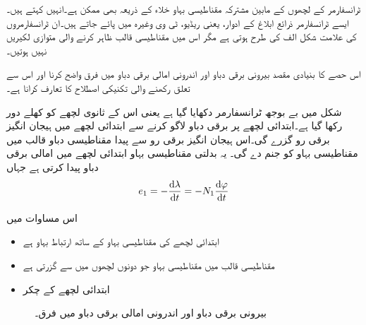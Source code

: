 ٹرانسفارمر کے لچھوں کے مابین مشترکہ مقناطیسی بہاو خلاء کے ذریعہ بھی ممکن ہے۔انہیں   کہتے ہیں۔ ایسے ٹرانسفارمر ذرائع ابلاغ کے ادوار، یعنی ریڈیو، ٹی وی وغیرہ میں پائے جاتے ہیں۔ان ٹرانسفارمروں کی علامت  شکل  الف کی طرح ہوتی ہے مگر اس میں مقناطیسی قالب ظاہر کرنے والی متوازی لکیریں نہیں ہوتیں۔

اس حصے کا بنیادی مقصد بیرونی برقی دباو   اور اندرونی امالی برقی دباو   میں فرق واضح کرنا اور اس سے تعلق رکھنے والی تکنیکی اصطلاح کا تعارف کرانا ہے۔

شکل   میں بے بوجھ ٹرانسفارمر دکھایا گیا ہے یعنی اس کے ثانوی لچھے کو کھلے دور رکھا گیا ہے۔ابتدائی لچھے پر  برقی دباو لاگو کرنے سے ابتدائی لچھے میں ہیجان انگیز برقی رو  گزرے گی۔اس ہیجان انگیز برقی رو سے پیدا مقناطیسی دباو   قالب میں مقناطیسی بہاو   کو جنم دے گی۔ یہ بدلتی مقناطیسی بہاو ابتدائی لچھے میں امالی برقی  دباو   پیدا کرتی ہے جہاں
\begin{align}
e_1=-\frac{\dif \lambda}{\dif t}=-N_1 \frac{\dif \varphi}{\dif t}
\end{align}

 اس مساوات میں
\begin{itemize}
\item
{} ابتدائی لچھے کی مقناطیسی بہاو کے ساتھ ارتباط بہاو ہے
\item
{} مقناطیسی قالب میں مقناطیسی بہاو جو دونوں لچھوں میں سے گزرتی ہے
\item
{} ابتدائی لچھے کے چکر
\end{itemize}
%
\begin{figure}
\centering
\caption{بیرونی برقی دباو اور اندرونی امالی برقی دباو میں فرق۔}
\label{شکل_ٹرانسفارمر_بیرونی_اور_اندرونی_برقی_دباو}
\end{figure}

